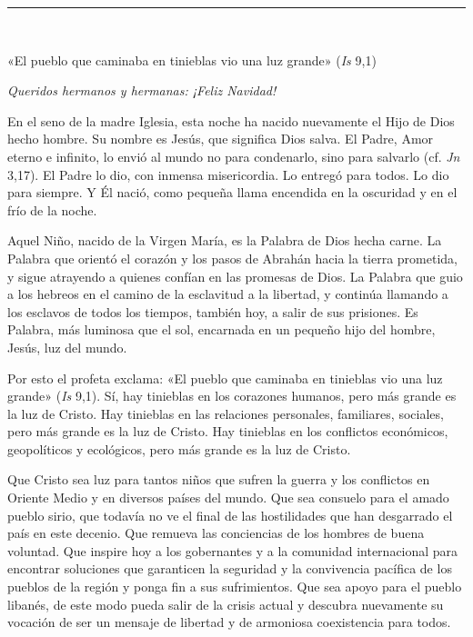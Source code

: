 \begin{center}\rule{0.5\linewidth}{\linethickness}\end{center}

~

«El pueblo que caminaba en tinieblas vio una luz grande» (\emph{Is} 9,1)

\emph{Queridos hermanos y hermanas: ¡Feliz Navidad!}

En el seno de la madre Iglesia, esta noche ha nacido nuevamente el Hijo
de Dios hecho hombre. Su nombre es Jesús, que significa Dios salva. El
Padre, Amor eterno e infinito, lo envió al mundo no para condenarlo,
sino para salvarlo (cf. \emph{Jn} 3,17). El Padre lo dio, con inmensa
misericordia. Lo entregó para todos. Lo dio para siempre. Y Él nació,
como pequeña llama encendida en la oscuridad y en el frío de la noche.

Aquel Niño, nacido de la Virgen María, es la Palabra de Dios hecha
carne. La Palabra que orientó el corazón y los pasos de Abrahán hacia la
tierra prometida, y sigue atrayendo a quienes confían en las promesas de
Dios. La Palabra que guio a los hebreos en el camino de la esclavitud a
la libertad, y continúa llamando a los esclavos de todos los tiempos,
también hoy, a salir de sus prisiones. Es Palabra, más luminosa que el
sol, encarnada en un pequeño hijo del hombre, Jesús, luz del mundo.

Por esto el profeta exclama: «El pueblo que caminaba en tinieblas vio
una luz grande» (\emph{Is} 9,1). Sí, hay tinieblas en los corazones
humanos, pero más grande es la luz de Cristo. Hay tinieblas en las
relaciones personales, familiares, sociales, pero más grande es la luz
de Cristo. Hay tinieblas en los conflictos económicos, geopolíticos y
ecológicos, pero más grande es la luz de Cristo.

Que Cristo sea luz para tantos niños que sufren la guerra y los
conflictos en Oriente Medio y en diversos países del mundo. Que sea
consuelo para el amado pueblo sirio, que todavía no ve el final de las
hostilidades que han desgarrado el país en este decenio. Que remueva las
conciencias de los hombres de buena voluntad. Que inspire hoy a los
gobernantes y a la comunidad internacional para encontrar soluciones que
garanticen la seguridad y la convivencia pacífica de los pueblos de la
región y ponga fin a sus sufrimientos. Que sea apoyo para el pueblo
libanés, de este modo pueda salir de la crisis actual y descubra
nuevamente su vocación de ser un mensaje de libertad y de armoniosa
coexistencia para todos.

